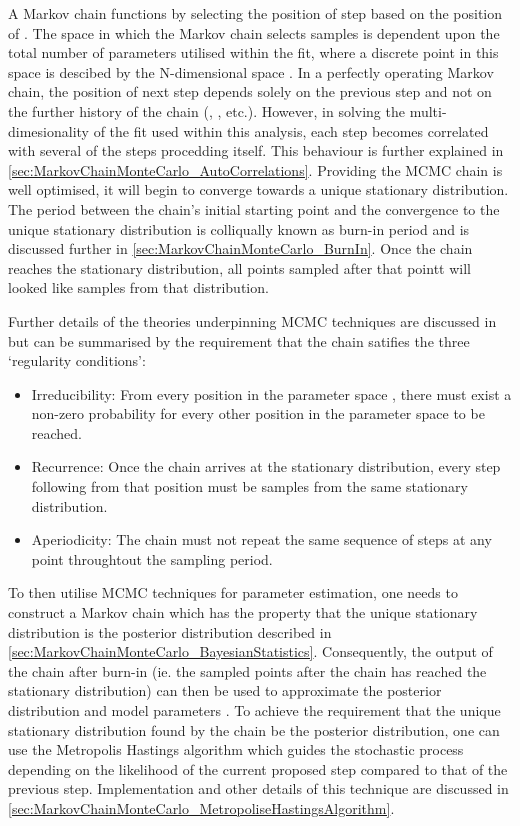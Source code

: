 A Markov chain functions by selecting the position of step  based on the position of . The space in which the Markov chain selects samples is dependent upon the total number of parameters utilised within the fit, where a discrete point in this space is descibed by the N-dimensional space . In a perfectly operating Markov chain, the position of next step depends solely on the previous step and not on the further history of the chain (, , etc.). However, in solving the multi-dimesionality of the fit used within this analysis, each step becomes correlated with several of the steps procedding itself. This behaviour is further explained in \autoref{sec:MarkovChainMonteCarlo_AutoCorrelations}. Providing the MCMC chain is well optimised, it will begin to converge towards a unique stationary distribution. The period between the chain's initial starting point and the convergence to the unique stationary distribution is colliqually known as burn-in period and is discussed further in \autoref{sec:MarkovChainMonteCarlo_BurnIn}. Once the chain reaches the stationary distribution, all points sampled after that pointt will looked like samples from that distribution.

Further details of the theories underpinning MCMC techniques are discussed in  but can be summarised by the requirement that the chain satifies the three `regularity conditions':

\begin{itemize}
\item Irreducibility: From every position in the parameter space , there must exist a non-zero probability for every other position in the parameter space to be reached.
\item Recurrence: Once the chain arrives at the stationary distribution, every step following from that position must be samples from the same stationary distribution.
\item Aperiodicity: The chain must not repeat the same sequence of steps at any point throughtout the sampling period.
\end{itemize}

To then utilise MCMC techniques for parameter estimation, one needs to construct a Markov chain which has the property that the unique stationary distribution is the posterior distribution described in \autoref{sec:MarkovChainMonteCarlo_BayesianStatistics}. Consequently, the output of the chain after burn-in (ie. the sampled points after the chain has reached the stationary distribution) can then be used to approximate the posterior distribution and model parameters \quickmath{\vec{\theta}}. To achieve the requirement that the unique stationary distribution found by the chain be the posterior distribution, one can use the Metropolis Hastings algorithm which guides the stochastic process depending on the likelihood of the current proposed step compared to that of the previous step. Implementation and other details of this technique are discussed in \autoref{sec:MarkovChainMonteCarlo_MetropoliseHastingsAlgorithm}.

